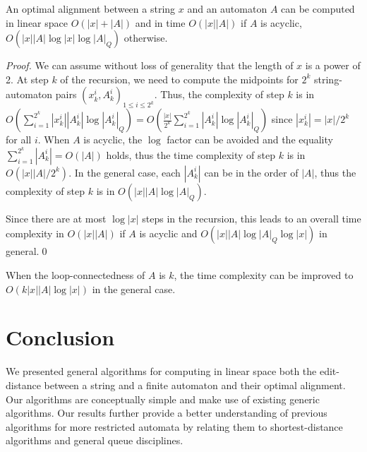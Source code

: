 \documentclass{llncs}
\newcommand{\0}{\overline{0}}
\newcommand{\1}{\overline{1}}
\newcommand{\+}{\oplus}
\renewcommand{\.}{\otimes}
\begin{document}
\begin{theorem}
  An optimal alignment between a string $x$ and an automaton $A$ can
  be computed in linear space $O(|x| + |A|)$ and in time $O(|x||A|)$
  if $A$ is acyclic, $O(|x||A| \log |x| \log |A|_Q)$ otherwise.
\end{theorem}
\begin{proof}
  We can assume without loss of generality that the length of $x$ is a
  power of 2.  At step $k$ of the recursion, we need to compute the
  midpoints for $2^k$ string-automaton pairs $(x^i_k, A^i_k)_{1 \le i
    \le 2^k}$. Thus, the complexity of step $k$ is in
  $O(\sum_{i=1}^{2^k} |x^i_k| |A^i_k| \log |A^i_k|_Q) = O(
  \frac{|x|}{2^k} \sum_{i=1}^{2^k} |A^i_k| \log |A^i_k|_Q)$ since
  $|x^i_k| = |x|/2^k$ for all $i$.  When $A$ is acyclic, the $\log$
  factor can be avoided and the equality $\sum_{i=1}^{2^k} |A^i_k| =
  O(|A|)$ holds, thus the time complexity of step $k$ is in
  $O(|x||A|/2^k)$. In the general case, each $|A^i_k|$ can be in the
  order of $|A|$, thus the complexity of step $k$ is in $O(|x||A| \log
  |A|_Q)$.

  Since there are at most $\log |x|$ steps in the recursion, this
  leads to an overall time complexity in $O(|x| |A|)$ if $A$ is
  acyclic and $O(|x| |A| \log |A|_Q \log |x|)$ in general.\qed
\end{proof}
When the loop-connectedness of $A$ is $k$, the time complexity can
be improved to $O(k |x| |A| \log |x|)$ in the general case.

\section{Conclusion}

We presented general algorithms for computing in linear space both the
edit-distance between a string and a finite automaton and their
optimal alignment. Our algorithms are conceptually simple and make use
of existing generic algorithms. Our results further provide a better
understanding of previous algorithms for more restricted automata by
relating them to shortest-distance algorithms and general queue
disciplines.



\end{document}
